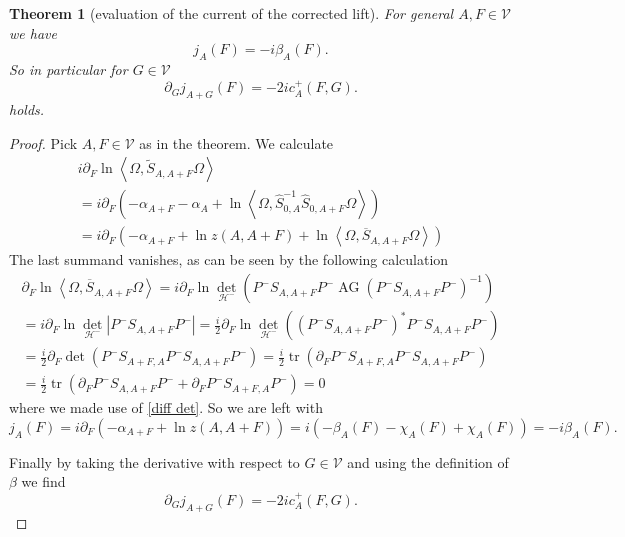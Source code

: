 \documentclass[b5paper,draft,openbib,12pt]{memoir}
\newtheorem{Thm}[Def]{Theorem}
\DeclareMathOperator{\tr}{tr}
\DeclareMathOperator{\AG}{AG}
\begin{document}
\begin{Thm}[evaluation of the current of the corrected lift]
For general \(A,F\in\mathcal{V}\) we have
\begin{equation}
j_A(F)=-i\beta_A(F).
\end{equation}
So in particular for \(G\in\mathcal{V}\)
\begin{equation}
\partial_G j_{A+G}(F)=-2i c^+_A(F,G).
\end{equation}
holds.
\end{Thm}
\begin{proof}
Pick \(A,F\in\mathcal{V}\) as in the theorem. We calculate
\begin{align}
i\partial_F \ln \left\langle\Omega, \tilde{S}_{A,A+F}\Omega\right\rangle\\
=i\partial_F\left( -\alpha_{A+F}-\alpha_A + \ln \left\langle\Omega, \hat{S}_{0,A}^{-1} \hat{S}_{0,A+F}\Omega\right\rangle\right)\\
=i\partial_F\left( -\alpha_{A+F}+\ln z(A,A+F) + \ln \left\langle\Omega, \overline{S}_{A,A+F}\Omega\right\rangle\right)
\end{align}
The last summand vanishes, as can be seen by the following calculation
\begin{align}
\partial_{F} \ln \left\langle \Omega, \overline{S}_{A,A+F}\Omega\right\rangle
=i\partial_F\ln \det_{\mathcal{H}^-} (P^-S_{A,A+F}P^-\AG(P^-S_{A,A+F}P^-)^{-1})\\
=i\partial_F\ln \det_{\mathcal{H}^-} |P^-S_{A,A+F}P^-|=\frac{i}{2} \partial_F \ln \det_{\mathcal{H}^-} ((P^- S_{A,A+F}P^-)^*P^- S_{A,A+F}P^-)\\
=\frac{i}{2} \partial_F \det (P^- S_{A+F,A}P^-S_{A,A+F}P^-)=\frac{i}{2}\tr(\partial_F P^-S_{A+F,A}P^-S_{A,A+F}P^-)\\
=\frac{i}{2}\tr(\partial_F P^-S_{A,A+F}P^-+\partial_F P^-S_{A+F,A}P^-)=0\end{align}
where we made use of \eqref{diff det}.
So we are left with
\begin{equation}
j_A(F)=i\partial_F (-\alpha_{A+F}+\ln z(A,A+F))=i(-\beta_A(F)-\chi_A(F)+\chi_A(F))=-i\beta_A(F).
\end{equation}

Finally by taking the derivative with respect to \(G\in\mathcal{V}\) and using the definition of \(\beta\) we find
\begin{equation}
\partial_G j_{A+G}(F)=-2i c_A^+(F,G).
\end{equation}


\end{proof}
\end{document}
